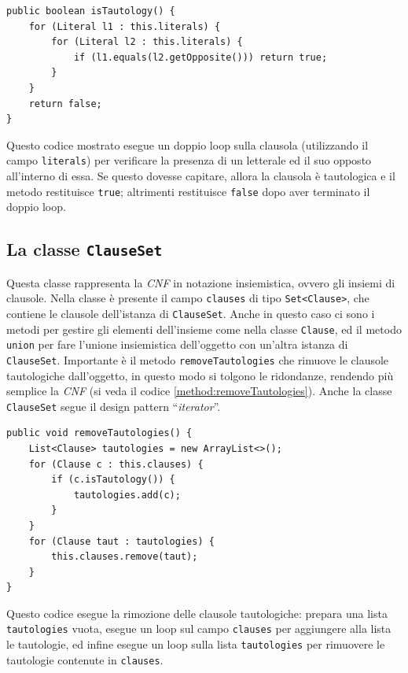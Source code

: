 \documentclass[a4paper,12pt]{report}
\begin{document}
\begin{minipage}{\linewidth}
\small
\begin{lstlisting}[caption={Metodo \texttt{isTautology} della classe \texttt{Clause}}, label={istaut}]
public boolean isTautology() {
    for (Literal l1 : this.literals) {
        for (Literal l2 : this.literals) { 
            if (l1.equals(l2.getOpposite())) return true;
        }
    }
    return false;
}
\end{lstlisting}
\end{minipage}
Questo codice mostrato esegue un doppio loop sulla clausola (utilizzando il campo \texttt{literals}) per verificare la presenza di un letterale ed il suo opposto all'interno di essa. Se questo dovesse capitare, allora la clausola è tautologica e il metodo restituisce \texttt{true}; altrimenti restituisce \texttt{false} dopo aver terminato il doppio loop.

\subsection{La classe \texttt{ClauseSet}}
\label{ClauseSet}
Questa classe rappresenta la \emph{CNF} in notazione insiemistica, ovvero gli insiemi di clausole. Nella classe è presente il campo \texttt{clauses} di tipo \texttt{Set<Clause>}, che contiene le clausole dell'istanza di \texttt{ClauseSet}. Anche in questo caso ci sono i metodi per gestire gli elementi dell'insieme come nella classe \texttt{Clause}, ed il metodo \texttt{union} per fare l'unione insiemistica dell'oggetto con un'altra istanza di \texttt{ClauseSet}. Importante è il metodo \texttt{removeTautologies} che rimuove le clausole tautologiche dall'oggetto, in questo modo si tolgono le ridondanze, rendendo più semplice la \emph{CNF} (si veda il codice \ref{method:removeTautologies}). Anche la classe \texttt{ClauseSet} segue il design pattern ``\emph{iterator}''.

\begin{minipage}{\linewidth}
\small
\begin{lstlisting}[caption={Metodo \texttt{removeTautologies} della classe \texttt{ClauseSet}}, label={method:removeTautologies}]
public void removeTautologies() {
    List<Clause> tautologies = new ArrayList<>();
    for (Clause c : this.clauses) {
        if (c.isTautology()) {
            tautologies.add(c);
        }
    }
    for (Clause taut : tautologies) {
        this.clauses.remove(taut);
    }
}
\end{lstlisting}
\end{minipage}
Questo codice esegue la rimozione delle clausole tautologiche: prepara una lista \texttt{tautologies} vuota, esegue un loop sul campo \texttt{clauses} per aggiungere alla lista le tautologie, ed infine esegue un loop sulla lista \texttt{tautologies} per rimuovere le tautologie contenute in \texttt{clauses}.
\end{document}
